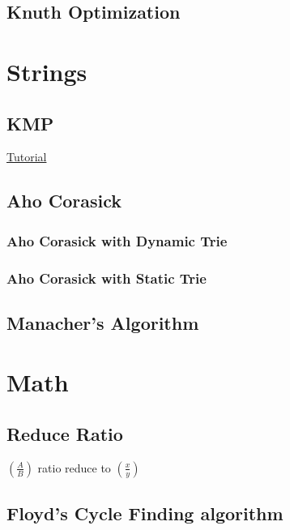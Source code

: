 \documentclass[11pt]{report}
\begin{document}
\section{Knuth Optimization}


\chapter{Strings}
\section{KMP}
\href{https://tanvir002700.wordpress.com/2015/03/03/kmp-knuth-morris-pratt-algorithm/}{Tutorial}

\section{Aho Corasick}
\subsection{Aho Corasick with Dynamic Trie}

\subsection{Aho Corasick with Static Trie}

\section{Manacher's Algorithm}



\chapter{Math}
\section{Reduce Ratio}
$\left(\frac{A}{B}\right)$ ratio reduce to $\left(\frac{x}{y}\right)$

\section{Floyd's Cycle Finding algorithm}

\end{document}

